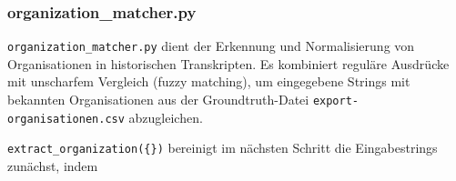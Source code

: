 \documentclass[12pt, a4paper, ngerman, bidi=default]{article}
\newcommand{\code}[1]{\colorbox{VeryLightGray}{\texttt{#1}}} %
\begin{document}
\begin{minipage}[t]{0.38\textwidth}
  \justifying%

  \subsubsection{organization\_matcher.py}\label{subsection:organization_matcher}

  \code{organization\_matcher.py} dient der Erkennung und Normalisierung von Organisationen in historischen Transkripten. Es kombiniert reguläre Ausdrücke mit unscharfem Vergleich (fuzzy matching), um eingegebene Strings mit bekannten Organisationen aus der Groundtruth-Datei \texttt{export-organisationen.csv} abzugleichen.

  \noindent \code{extract\_organization(\{\})} bereinigt im nächsten Schritt die Eingabestrings zunächst, indem 
\end{minipage}%
\hfill
\end{document}
